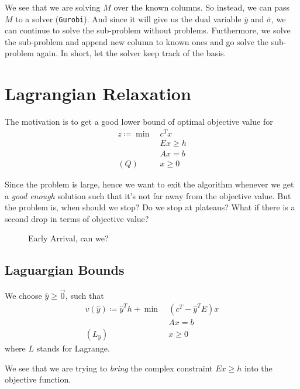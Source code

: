 \begin{prev}
\begin{remark}
		\begin{note}
			We see that we are solving \(M\) over the known columns. So instead, we can pass \(M\) to a solver (\texttt{Gurobi}). And since
			it will give us the dual variable \(\overline{y}\) and \(\overline{\sigma}\), we can continue to solve the sub-problem without problems.
			Furthermore, we solve the sub-problem and append new column to known ones and go solve the sub-problem again. In short, let the solver
			keep track of the basis.
		\end{note}
	\end{remark}
\end{prev}

\section{Lagrangian Relaxation}
The motivation is to get a good lower bound of optimal objective value for
\begin{align*}
	z\coloneqq \min~ & c^{T}x    \\
	                 & Ex \geq h \\
	                 & Ax = b    \\
	(Q)\quad         & x\geq 0
\end{align*}

Since the problem is large, hence we want to exit the algorithm whenever we get a \emph{good enough} solution such that it's not far away from the objective
value. But the problem is, when should we stop? Do we stop at plateaus? What if there is a second drop in terms of objective value?

\begin{figure}[H]
	\centering
	\caption{Early Arrival, can we?}
	\label{fig:plateau}
\end{figure}

\subsection{Laguargian Bounds}
We choose \(\hat{y}\geq \vec{0}\), such that
\begin{align*}
	v(\hat{y})\coloneqq \hat{y}^{T}h + \min~ & (c^{T} - \hat{y}^{T}E)x \\
	                                         & Ax = b                  \\
	(L_{\hat{y}})\quad                       & x\geq 0
\end{align*}
where \(L\) stands for Lagrange.
\begin{intuition}
	We see that we are trying to \emph{bring} the complex constraint \(Ex\geq h\) into the objective function.
\end{intuition}

